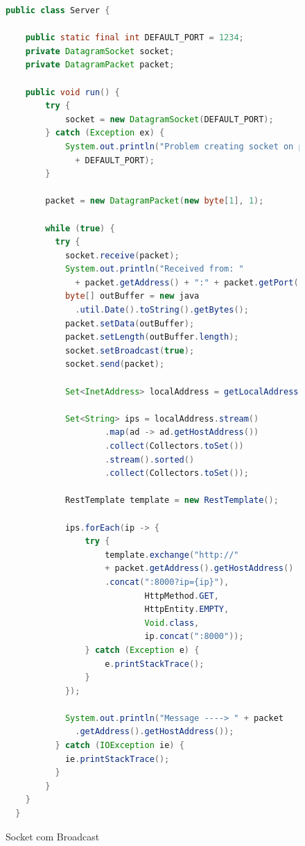 \documentclass[journal]{IEEEtran}
\begin{document}
\begin{figure}[H]
\centering

\begin{lstlisting}[language=Java]
  public class Server {

    public static final int DEFAULT_PORT = 1234;
    private DatagramSocket socket;
    private DatagramPacket packet;

    public void run() {
        try {
            socket = new DatagramSocket(DEFAULT_PORT);
        } catch (Exception ex) {
            System.out.println("Problem creating socket on port: " 
              + DEFAULT_PORT);
        }

        packet = new DatagramPacket(new byte[1], 1);

        while (true) {
          try {
            socket.receive(packet);
            System.out.println("Received from: " 
              + packet.getAddress() + ":" + packet.getPort());
            byte[] outBuffer = new java
              .util.Date().toString().getBytes();
            packet.setData(outBuffer);
            packet.setLength(outBuffer.length);
            socket.setBroadcast(true);
            socket.send(packet);

            Set<InetAddress> localAddress = getLocalAddress();

            Set<String> ips = localAddress.stream()
                    .map(ad -> ad.getHostAddress())
                    .collect(Collectors.toSet())
                    .stream().sorted()
                    .collect(Collectors.toSet());

            RestTemplate template = new RestTemplate();

            ips.forEach(ip -> {
                try {
                    template.exchange("http://" 
                    + packet.getAddress().getHostAddress()
                    .concat(":8000?ip={ip}"),
                            HttpMethod.GET,
                            HttpEntity.EMPTY,
                            Void.class,
                            ip.concat(":8000"));
                } catch (Exception e) {
                    e.printStackTrace();
                }
            });

            System.out.println("Message ----> " + packet
              .getAddress().getHostAddress());
          } catch (IOException ie) {
            ie.printStackTrace();
          }
        }
    }
  }
\end{lstlisting}
\caption{Socket com Broadcast}
\label{broadcastcodejava}
\end{figure}
\end{document}
